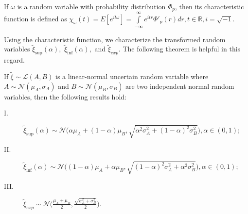 \begin{definition}\cite{Liu 2004}\label{def.12}
	If $\omega$ is a random variable with probability distribution $\Phi_p$, then its characteristic function is defined as $\chi_{\omega}(t)=E[e^{it\omega }]=\int\limits_{-\infty}^{\infty}e^{itr}{\Phi'_p}(r)dr,t\in \mathbb{R},i=\sqrt{-1}.$
\end{definition} 
\par Using the characteristic function, we characterize the transformed random variables $\tilde\xi_{\sup}(\alpha),$ $\tilde\xi_{\inf}(\alpha),$ and $\tilde\xi_{exp}.$ The following theorem is helpful in this regard.
\begin{theorem}\label{thm.5}
If $\tilde{\xi}\sim \mathcal{L}(A,B)$ is a linear-normal uncertain random variable where $A\sim \mathcal{N}(\mu_A,\sigma_A)$ and $B\sim \mathcal{N}(\mu_B,\sigma_B)$ are two independent normal random variables, then the following results hold:
	\begin{description}
		\item[ I.] $\tilde\xi_{\sup}(\alpha)\sim \mathcal{N}\big(\alpha\mu_A+(1-\alpha)\mu_B,\sqrt{\alpha^2\sigma_A^2+(1-\alpha)^2\sigma_B^2}\big),\alpha\in (0,1);$
		\item[ II.] $\tilde\xi_{\inf}(\alpha)\sim \mathcal{N}\big((1-\alpha)\mu_A+\alpha\mu_B,\sqrt{(1-\alpha)^2\sigma_A^2+\alpha^2\sigma_B^2}\big),\alpha\in (0,1);$
		\item[ III.] $\tilde\xi_{exp}\sim \mathcal{N}\big(\frac{\mu_A+\mu_B}{2},\frac{\sqrt{\sigma_A^2+\sigma_B^2}}{2}\big).$
	\end{description} 
\end{theorem}

